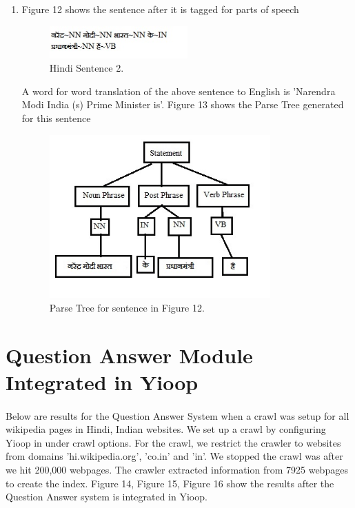 \begin{enumerate}
\break
\item  Figure 12 shows the sentence after it is tagged for parts of speech

\begin{figure}[htb]
\centering
\includegraphics[width=0.5\textwidth]{images/sentence_testcase2.jpg}
\caption{Hindi Sentence 2.} 
\label{fig:sentence_testcase2}
\end{figure}

A word for word translation of the above sentence to English is 'Narendra Modi India (s) Prime Minister is'. Figure 13 shows the Parse Tree generated for this sentence 

\begin{figure}[htb]
\centering
\includegraphics[width=0.8\textwidth]{images/standalone_testcase2.jpg}
\caption{Parse Tree for sentence in Figure 12.} 
\label{fig:standalone_testcase2}
\end{figure}

\end{enumerate}

\break
\section{Question Answer Module Integrated in Yioop}
\paragraph{}
Below are results for the Question Answer System when a crawl was setup for all wikipedia pages in Hindi, Indian websites. We set up a crawl by configuring Yioop in under crawl options. For the crawl, we restrict the crawler to websites from domains 'hi.wikipedia.org', 'co.in' and 'in'. We stopped the crawl was after we hit 200,000 webpages. The crawler extracted information from 7925 webpages to create the index. Figure 14, Figure 15, Figure 16 show the results after the Question Answer system is integrated in Yioop. 

